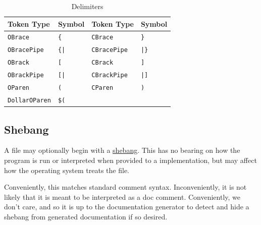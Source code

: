 \begin{table}[h]
    \centering
    \begin{tabular}[t]{llll}
        \hline
        \textbf{Token Type} & \textbf{Symbol}& \textbf{Token Type} & \textbf{Symbol} \\
        \hline
        \texttt{OBrace} & \texttt{\{}& \texttt{CBrace} & \texttt{\}} \\
        \texttt{OBracePipe} & \texttt{\{|}& \texttt{CBracePipe} & \texttt{|\}} \\
        \texttt{OBrack} & \texttt{[} & \texttt{CBrack} & \texttt{]} \\
        \texttt{OBrackPipe} & \texttt{[|}& \texttt{CBrackPipe} & \texttt{|]} \\
        \texttt{OParen} & \texttt{(} & \texttt{CParen} & \texttt{)} \\
        \texttt{DollarOParen} & \texttt{\$(} & & \\ %
        \hline
    \end{tabular}
    \caption{\label{tab:delimiters}Delimiters}
\end{table}

\subsection{Shebang}

A \Trilogy{} file may optionally begin with a
\href{https://en.wikipedia.org/wiki/Shebang_(Unix)}{shebang}. This has no bearing
on how the program is run or interpreted when provided to a \Trilogy{} implementation,
but may affect how the operating system treats the file.

Conveniently, this matches standard comment syntax. Inconveniently, it is not
likely that it is meant to be interpreted as a doc comment. Conveniently,
we don't care, and so it is up to the documentation generator to detect and
hide a shebang from generated documentation if so desired.

\FloatBarrier
